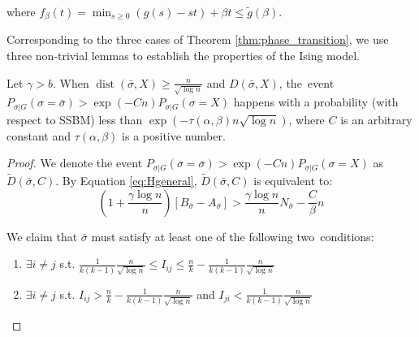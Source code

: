 \documentclass[entropy,article,accept,moreauthors,pdftex]{Definitions/mdpi}
\newcommand{\1}{\mathbbm{1}}
\DeclareMathOperator{\Dist}{dist}
\begin{document}
\begin{paracol}{2}
\begin{Lemma}
	where $f_{\beta}(t) = \min_{s\geq 0} (g(s) - st) + \beta t \leq \tilde{g}(\beta) $.
\end{Lemma}
Corresponding to the three cases of Theorem \ref{thm:phase_transition}, we use three non-trivial lemmas to 
establish the properties of the Ising model.
\begin{Lemma}\label{lem:sigmaX}
	Let $\gamma > b$. When $\Dist(\bar{\sigma}, X) \geq \frac{n}{\sqrt{\log n}}$ and $D(\bar{\sigma}, X)$, the~event\linebreak
	$P_{\sigma | G}(\sigma = \bar{\sigma} ) > \exp(-Cn) P_{\sigma | G}(\sigma = X)$
	happens with a probability (with respect to %
	SSBM) less than $\exp(-\tau(\alpha,\beta) n \sqrt{\log  n} )$,
	where $C$ is an arbitrary constant and $\tau(\alpha,\beta)$ is a positive number.
\end{Lemma}
\begin{proof}
	We denote the event $P_{\sigma | G}(\sigma = \bar{\sigma} ) > \exp(-Cn) P_{\sigma | G}(\sigma = X)$ as $\widetilde{D}(\bar{\sigma}, C)$.
	By Equation \eqref{eq:Hgeneral}, $\widetilde{D}(\bar{\sigma}, C)$
	is equivalent to:
\begin{equation}\label{eq:BwA}
	(1 + \frac{\gamma \log n}{n})[B_{\bar{\sigma}} - A_{\bar{\sigma}}] >  \frac{\gamma \log n}{n} N_{\bar{\sigma}}  - \frac{C}{\beta} n
	\end{equation}
	
	We claim that $\bar{\sigma}$ must satisfy at least one of the following two~conditions:
	\begin{enumerate}
		\item $\exists i\neq j$ s.t. $\frac{1}{k(k-1)}\frac{n}{\sqrt{\log n}} \leq I_{ij} \leq \frac{n}{k} - \frac{1}{k(k-1)}\frac{n}{\sqrt{\log n}}$
		\item $\exists i \neq j$ s.t. $I_{ij} > \frac{n}{k} - \frac{1}{k(k-1)}\frac{n}{\sqrt{\log n}}$ and $I_{ji} < \frac{1}{k(k-1)}\frac{n}{\sqrt{\log n}}$
	\end{enumerate}
	

\end{proof}
\end{paracol}
\end{document}
